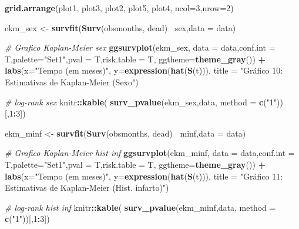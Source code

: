 \documentclass[]{article}
\newenvironment{Shaded}{\begin{snugshade}}{\end{snugshade}}
\newcommand{\KeywordTok}[1]{\textcolor[rgb]{0.13,0.29,0.53}{\textbf{#1}}}
\newcommand{\DataTypeTok}[1]{\textcolor[rgb]{0.13,0.29,0.53}{#1}}
\newcommand{\DecValTok}[1]{\textcolor[rgb]{0.00,0.00,0.81}{#1}}
\newcommand{\StringTok}[1]{\textcolor[rgb]{0.31,0.60,0.02}{#1}}
\newcommand{\CommentTok}[1]{\textcolor[rgb]{0.56,0.35,0.01}{\textit{#1}}}
\newcommand{\OperatorTok}[1]{\textcolor[rgb]{0.81,0.36,0.00}{\textbf{#1}}}
\newcommand{\NormalTok}[1]{#1}
\begin{document}
\begin{Shaded}
\begin{Highlighting}[]
{{\KeywordTok{grid.arrange}\NormalTok{(plot1, plot3, plot2,}
\NormalTok{             plot5, plot4, }\DataTypeTok{ncol=}\DecValTok{3}\NormalTok{,}\DataTypeTok{nrow=}\DecValTok{2}\NormalTok{)}

\NormalTok{ekm_sex <-}\StringTok{ }\KeywordTok{survfit}\NormalTok{(}\KeywordTok{Surv}\NormalTok{(obsmonths, dead)}\OperatorTok{~}\StringTok{ }\NormalTok{sex,}\DataTypeTok{data =}\NormalTok{ data)}

\CommentTok{# Grafico Kaplan-Meier sex}
\KeywordTok{ggsurvplot}\NormalTok{(ekm_sex, }\DataTypeTok{data =}\NormalTok{ data,}\DataTypeTok{conf.int =}\NormalTok{ T,}\DataTypeTok{palette=}\StringTok{"Set1"}\NormalTok{,}\DataTypeTok{pval =}\NormalTok{ T,}\DataTypeTok{risk.table =}\NormalTok{ T,}
           \DataTypeTok{ggtheme=}\KeywordTok{theme_gray}\NormalTok{()) }\OperatorTok{+}\StringTok{ }
\StringTok{  }\KeywordTok{labs}\NormalTok{(}\DataTypeTok{x=}\StringTok{"Tempo (em meses)"}\NormalTok{,}
       \DataTypeTok{y=}\KeywordTok{expression}\NormalTok{(}\KeywordTok{hat}\NormalTok{(}\KeywordTok{S}\NormalTok{(t))),}
       \DataTypeTok{title =} \StringTok{"Gráfico 10: Estimativas de Kaplan-Meier (Sexo"}\NormalTok{) }

\CommentTok{# log-rank sex}
\NormalTok{knitr}\OperatorTok{::}\KeywordTok{kable}\NormalTok{( }\KeywordTok{surv_pvalue}\NormalTok{(ekm_sex,data, }\DataTypeTok{method =} \KeywordTok{c}\NormalTok{(}\StringTok{"1"}\NormalTok{))[,}\DecValTok{1}\OperatorTok{:}\DecValTok{3}\NormalTok{])}

\NormalTok{ekm_minf <-}\StringTok{ }\KeywordTok{survfit}\NormalTok{(}\KeywordTok{Surv}\NormalTok{(obsmonths, dead)}\OperatorTok{~}\StringTok{ }\NormalTok{minf,}\DataTypeTok{data =}\NormalTok{ data)}

\CommentTok{# Grafico Kaplan-Meier hist inf}
\KeywordTok{ggsurvplot}\NormalTok{(ekm_minf, }\DataTypeTok{data =}\NormalTok{ data,}\DataTypeTok{conf.int =}\NormalTok{ T,}\DataTypeTok{palette=}\StringTok{"Set1"}\NormalTok{,}\DataTypeTok{pval =}\NormalTok{ T,}\DataTypeTok{risk.table =}\NormalTok{ T,}
           \DataTypeTok{ggtheme=}\KeywordTok{theme_gray}\NormalTok{()) }\OperatorTok{+}\StringTok{ }
\StringTok{  }\KeywordTok{labs}\NormalTok{(}\DataTypeTok{x=}\StringTok{"Tempo (em meses)"}\NormalTok{,}
       \DataTypeTok{y=}\KeywordTok{expression}\NormalTok{(}\KeywordTok{hat}\NormalTok{(}\KeywordTok{S}\NormalTok{(t))),}
       \DataTypeTok{title =} \StringTok{"Gráfico 11: Estimativas de Kaplan-Meier (Hist. infarto)"}\NormalTok{) }

\CommentTok{# log-rank hist inf}
\NormalTok{knitr}\OperatorTok{::}\KeywordTok{kable}\NormalTok{( }\KeywordTok{surv_pvalue}\NormalTok{(ekm_minf,data, }\DataTypeTok{method =} \KeywordTok{c}\NormalTok{(}\StringTok{"1"}\NormalTok{))[,}\DecValTok{1}\OperatorTok{:}\DecValTok{3}\NormalTok{])}

}}
\end{Highlighting}
\end{Shaded}
\end{document}
